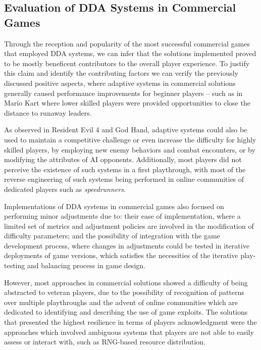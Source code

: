 \subsection{Evaluation of DDA Systems in Commercial Games}


Through the reception and popularity of the most successful commercial games that employed DDA systems, we can infer that the solutions implemented proved to be mostly beneficent contributors to the overall player experience. To justify this claim and identify the contributing factors we can verify the previously discussed positive aspects, where adaptive systems in commercial solutions generally caused performance improvements for beginner players -- such as in Mario Kart where lower skilled players were provided opportunities to close the distance to runaway leaders.

As observed in Resident Evil 4 and God Hand, adaptive systems could also be used to maintain a competitive challenge or even increase the difficulty for highly skilled players, by employing new enemy behaviors and combat encounters, or by modifying the attributes of AI opponents. Additionally, most players did not perceive the existence of such systems in a first playthrough, with most of the reverse engineering of such systems being performed in online communities of dedicated players such as \emph{speedrunners}.

Implementations of DDA systems in commercial games also focused on performing minor adjustments due to: their ease of implementation, where a limited set of metrics and adjustment policies are involved in the modification of difficulty parameters; and the possibility of integration with the game development process, where changes in adjustments could be tested in iterative deployments of game versions, which satisfies the necessities of the iterative play-testing and balancing process in game design.

However, most approaches in commercial solutions showed a difficulty of being abstracted to veteran players, due to the possibility of recognition of patterns over multiple playthroughs and the advent of online communities which are dedicated to identifying and describing the use of game exploits. The solutions that presented the highest resilience in terms of players acknowledgment were the approaches which involved ambiguous systems that players are not able to easily assess or interact with, such as RNG-based resource distribution.

